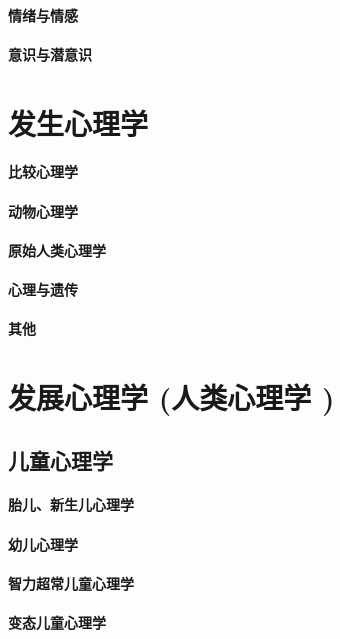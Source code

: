 \documentclass[UTF8]{../RepresentationUniverse}
\begin{document}
\subsubsection{情绪与情感}
\subsubsection{意识与潜意识}

\chapter{发生心理学}
\subsubsection{比较心理学}
\subsubsection{动物心理学}
\subsubsection{原始人类心理学}
\subsubsection{心理与遗传}
\subsubsection{其他}

\chapter{发展心理学 (人类心理学 )}
\section{儿童心理学}
    \subsubsection{胎儿、新生儿心理学}
    \subsubsection{幼儿心理学}
    \subsubsection{智力超常儿童心理学}
    \subsubsection{变态儿童心理学}
\end{document}
